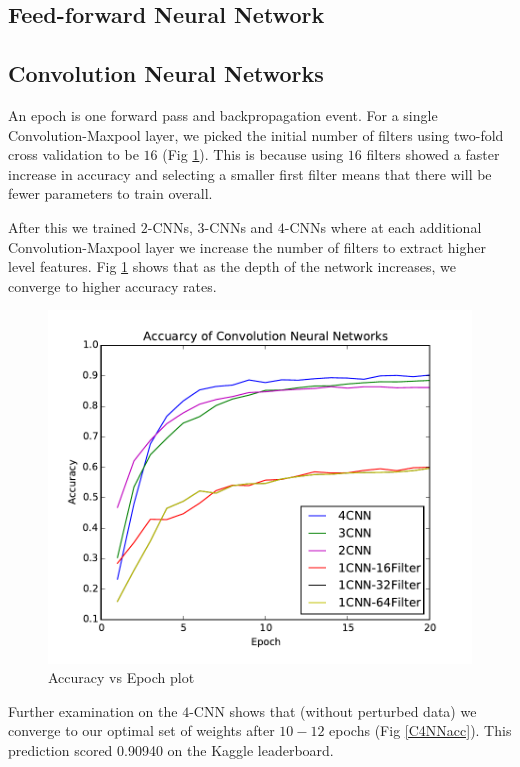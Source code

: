 \documentclass[conference]{IEEEtran}
\begin{document}
\subsection{Feed-forward Neural Network}


\subsection{Convolution Neural Networks}
An epoch is one forward pass and backpropagation event. For a single Convolution-Maxpool layer, we picked the initial number of filters using two-fold cross validation to be $16$ (Fig \ref{CNNacc}). This is because using $16$ filters showed a faster increase in accuracy and selecting a smaller first filter means that there will be fewer parameters to train overall.

After this we trained $2$-CNNs, $3$-CNNs and $4$-CNNs where at each additional Convolution-Maxpool layer we increase the number of filters to extract higher level features. Fig \ref{CNNacc} shows that as the depth of the network increases, we converge to higher accuracy rates.

\begin{figure}[h]
	\centering
	\includegraphics[scale=0.6]{CNNacc.pdf}
	\caption{Accuracy vs Epoch plot}
		\label{CNNacc}
\end{figure}

Further examination on the $4$-CNN shows that (without perturbed data) we converge to our optimal set of weights after $10-12$ epochs (Fig \ref{C4NNacc}). This prediction scored 0.90940 on the Kaggle leaderboard.
\end{document}
